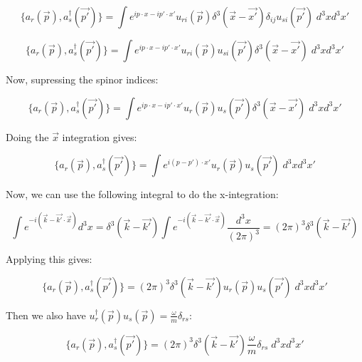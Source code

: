 \documentclass[a4]{article}
\begin{document}
    \begin{equation}
        \{a_r (\vec{p}), a_s^{\dagger} (\vec{p'})\} = \int e^{i p \cdot x - i p' \cdot x'} u_{ri} (\vec{p}) \delta^{3} (\vec{x} - \vec{x'}) \delta_{ij} u_{si} (\vec{p'}) \; d^3 x d^3 x'
    \end{equation}

    \begin{equation}
        \{a_r (\vec{p}), a_s^{\dagger} (\vec{p'})\} = \int e^{i p \cdot x - i p' \cdot x'} u_{ri} (\vec{p}) u_{si} (\vec{p'}) \delta^{3} (\vec{x} - \vec{x'}) \; d^3 x d^3 x'
    \end{equation}

    Now, supressing the spinor indices:

    \begin{equation}
        \{a_r (\vec{p}), a_s^{\dagger} (\vec{p'})\} = \int e^{i p \cdot x - i p' \cdot x'} u_r (\vec{p}) u_s (\vec{p'}) \delta^{3} (\vec{x} - \vec{x'}) \; d^3 x d^3 x'
    \end{equation}

    Doing the $\vec{x}$ integration gives:

    \begin{equation}
        \{a_r (\vec{p}), a_s^{\dagger} (\vec{p'})\} = \int e^{i (p - p') \cdot x'} u_r (\vec{p}) u_s (\vec{p'}) \; d^3 x d^3 x'
    \end{equation}

    Now, we can use the following integral to do the x-integration:

    \begin{equation}
        \int e^{- i (\vec{k} - \vec{k'} \cdot \vec{x})} d^3 x = \delta^3 (\vec{k} - \vec{k'}) \int e^{- i (\vec{k} - \vec{k'} \cdot \vec{x})} \frac{d^3 x}{(2 \pi)^3} = (2 \pi)^3 \delta^3 (\vec{k} - \vec{k'})
    \end{equation}

    Applying this gives:

    \begin{equation}
        \{a_r (\vec{p}), a_s^{\dagger} (\vec{p'})\} = (2 \pi)^3 \delta^3 (\vec{k} - \vec{k'}) u_r (\vec{p}) u_s (\vec{p'}) \; d^3 x d^3 x'
    \end{equation}

    Then we also have $u_r^{\dagger} (\vec{p}) u_s (\vec{p}) = \frac{\omega}{m} \delta_{rs}$:

    \begin{framed}
        \begin{equation}
            \{a_r (\vec{p}), a_s^{\dagger} (\vec{p'})\} = (2 \pi)^3 \delta^3 (\vec{k} - \vec{k'}) \frac{\omega}{m} \delta_{rs} \; d^3 x d^3 x'
        \end{equation}
    \end{framed}
\end{document}
